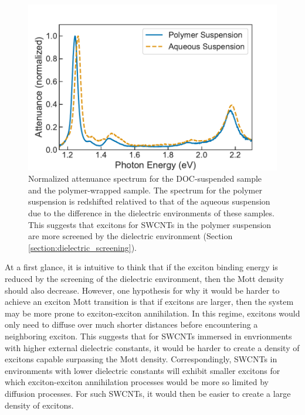\begin{figure}[H]
	\centering
	\includegraphics[scale=0.8]{images/chapter_my_data/abs_normalized}
	\caption{Normalized attenuance spectrum for the DOC-suspended sample and the polymer-wrapped sample. The spectrum for the polymer suspension is redshifted relatived to that of the aqueous suspension due to the difference in the dielectric environments of these samples. This suggests that excitons for SWCNTs in the polymer suspension are more screened by the dielectric environment (Section \ref{section:dielectric_screening}).}
	\label{fig:abs_comp_normalized}
\end{figure}


At a first glance, it is intuitive to think that if the exciton binding energy is reduced by the screening of the dielectric environment, then the Mott density should also decrease. However, one hypothesis for why it would be harder to achieve an exciton Mott transition is that if excitons are larger, then the system may be more prone to exciton-exciton annihilation. In this regime, excitons would only need to diffuse over much shorter distances before encountering a neighboring exciton. This suggests that for SWCNTs immersed in envrionments with higher external dielectric constants, it would be harder to create a density of excitons capable surpassing the Mott density. Correspondingly, SWCNTs in environments with lower dielectric constants will exhibit smaller excitons for which exciton-exciton annihilation processes would be more so limited by diffusion processes. For such SWCNTs, it would then be easier to create a large density of excitons.

